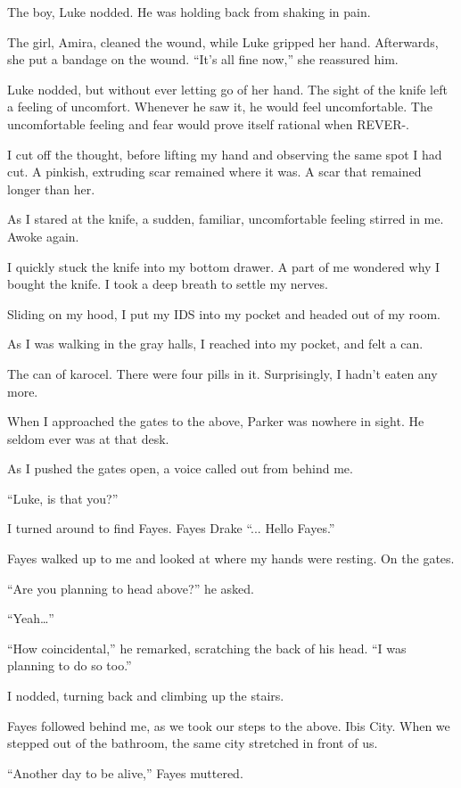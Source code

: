 The boy, Luke nodded. He was holding back from shaking in pain.

The girl, Amira, cleaned the wound, while Luke gripped her hand. Afterwards, she put a bandage on the wound. “It’s all fine now,” she reassured him.

Luke nodded, but without ever letting go of her hand. The sight of the knife left a feeling of uncomfort. Whenever he saw it, he would feel uncomfortable. The uncomfortable feeling and fear would prove itself rational when REVER-.

I cut off the thought, before lifting my hand and observing the same spot I had cut. A pinkish, extruding scar remained where it was. A scar that remained longer than her.

As I stared at the knife, a sudden, familiar, uncomfortable feeling stirred in me. Awoke again. 

I quickly stuck the knife into my bottom drawer. A part of me wondered why I bought the knife. I took a deep breath to settle my nerves. 

Sliding on my hood, I put my IDS into my pocket and headed out of my room.

As I was walking in the gray halls, I reached into my pocket, and felt a can.

The can of karocel. There were four pills in it. Surprisingly, I hadn’t eaten any more.

When I approached the gates to the above, Parker was nowhere in sight. He seldom ever was at that desk.

As I pushed the gates open, a voice called out from behind me. 

“Luke, is that you?”

I turned around to find Fayes. Fayes Drake
“... Hello Fayes.”

Fayes walked up to me and looked at where my hands were resting. On the gates.

“Are you planning to head above?” he asked.

“Yeah…”

“How coincidental,” he remarked, scratching the back of his head. “I was planning to do so too.”

I nodded, turning back and climbing up the stairs.

Fayes followed behind me, as we took our steps to the above. Ibis City. When we stepped out of the bathroom, the same city stretched in front of us.

“Another day to be alive,” Fayes muttered.

